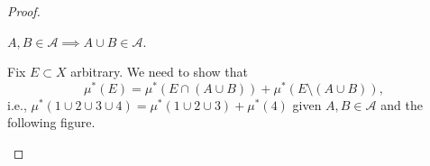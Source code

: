 \begin{proof}
\begin{enumerate}[(a)]
\begin{itemize}
			            \begin{claim}\label{pf:Caratheodory-extension-1-finite-unions}
				            \(A, B\in \mathcal{A} \implies A\cup B\in \mathcal{A}\).
			            \end{claim}
			            \begin{explanation}
				            Fix \(E\subset X\) arbitrary. We need to show that
				            \[
					            \mu^{\ast} (E) = \mu^{\ast} (E\cap (A\cup B)) + \mu^{\ast} (E\setminus (A\cup B)),
				            \]
				            i.e., \(\mu^{\ast} (1\cup 2\cup 3\cup 4) = \mu^{\ast} (1\cup 2\cup 3) + \mu^{\ast} (4)\) given \(A, B\in\mathcal{A}\) and the following figure.

				            \begin{figure}[H]
					            \centering
					            \label{fig:thm:Caratheodory-extension-1a}
				            \end{figure}


\end{explanation}
\end{itemize}
\end{enumerate}
\end{proof}
